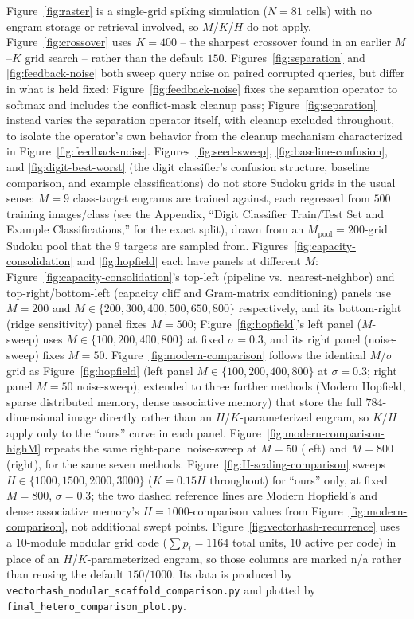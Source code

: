 \documentclass[11pt]{article}
\begin{document}
Figure~\ref{fig:raster} is a single-grid spiking simulation ($N{=}81$ cells) with no engram
storage or retrieval involved, so $M$/$K$/$H$ do not apply. Figure~\ref{fig:crossover} uses
$K{=}400$ -- the sharpest crossover found in an earlier $M$--$K$ grid search -- rather than the
default $150$. Figures~\ref{fig:separation} and \ref{fig:feedback-noise} both sweep query noise
on paired corrupted queries, but differ in what is held fixed: Figure~\ref{fig:feedback-noise}
fixes the separation operator to softmax and includes the conflict-mask cleanup pass;
Figure~\ref{fig:separation} instead varies the separation operator itself, with cleanup
excluded throughout, to isolate the operator's own behavior from the cleanup mechanism
characterized in Figure~\ref{fig:feedback-noise}. Figures~\ref{fig:seed-sweep},
\ref{fig:baseline-confusion}, and \ref{fig:digit-best-worst} (the digit classifier's confusion
structure, baseline comparison, and example classifications) do not store Sudoku grids in the
usual sense: $M{=}9$ class-target engrams are trained against, each regressed from $500$
training images/class (see the Appendix, ``Digit Classifier Train/Test Set and Example
Classifications,'' for the exact split),
drawn from an $M_{\mathrm{pool}}{=}200$-grid Sudoku pool that the $9$ targets are sampled from.
Figures~\ref{fig:capacity-consolidation} and \ref{fig:hopfield} each have panels at different
$M$: Figure~\ref{fig:capacity-consolidation}'s top-left (pipeline vs.\ nearest-neighbor) and
top-right/bottom-left (capacity cliff and Gram-matrix conditioning) panels use $M{=}200$ and
$M{\in}\{200,300,400,500,650,800\}$ respectively, and its bottom-right (ridge sensitivity)
panel fixes $M{=}500$; Figure~\ref{fig:hopfield}'s left panel ($M$-sweep) uses
$M{\in}\{100,200,400,800\}$ at fixed $\sigma{=}0.3$, and its right panel (noise-sweep) fixes
$M{=}50$. Figure~\ref{fig:modern-comparison} follows the identical $M$/$\sigma$ grid as
Figure~\ref{fig:hopfield} (left panel $M{\in}\{100,200,400,800\}$ at $\sigma{=}0.3$; right panel
$M{=}50$ noise-sweep), extended to three further methods (Modern Hopfield, sparse distributed
memory, dense associative memory) that store the full $784$-dimensional image directly rather
than an $H$/$K$-parameterized engram, so $K$/$H$ apply only to the ``ours'' curve in each panel.
Figure~\ref{fig:modern-comparison-highM} repeats the same right-panel noise-sweep at
$M{=}50$ (left) and $M{=}800$ (right), for the same seven methods. Figure~\ref{fig:H-scaling-comparison}
sweeps $H{\in}\{1000,1500,2000,3000\}$ ($K{=}0.15H$ throughout) for ``ours'' only, at fixed
$M{=}800$, $\sigma{=}0.3$; the two dashed reference lines are Modern Hopfield's and dense
associative memory's $H{=}1000$-comparison values from Figure~\ref{fig:modern-comparison}, not additional swept
points. Figure~\ref{fig:vectorhash-recurrence} uses a $10$-module modular grid code ($\sum
p_i{=}1164$ total units, $10$ active per code) in place of an $H$/$K$-parameterized engram, so
those columns are marked n/a rather than reusing the default $150$/$1000$. Its data is produced
by \texttt{vectorhash\_modular\_scaffold\_comparison.py} and plotted by
\texttt{final\_hetero\_comparison\_plot.py}.
\end{document}
